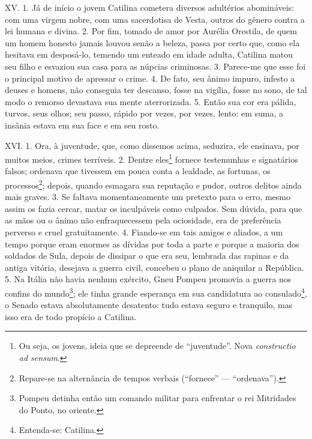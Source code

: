 XV. 1. Já de início o jovem Catilina cometera diversos adultérios abomináveis:
com uma virgem nobre, com uma sacerdotisa de Vesta, outros do gênero contra a
lei humana e divina. 2. Por fim, tomado de amor por Aurélia Orestila, de quem
um homem honesto jamais louvou senão a beleza, passa por certo que, como
ela hesitava em desposá-lo, temendo um enteado em idade adulta, Catilina matou
seu filho e esvaziou sua casa para as núpcias criminosas. 3. Parece-me que esse
foi o principal motivo de apressar o crime. 4. De fato, seu ânimo impuro,
infesto a deuses e homens, não conseguia ter descanso, fosse na vigília, fosse
no sono, de tal modo o remorso devastava sua mente aterrorizada. 5. Então sua
cor era pálida, turvos, seus olhos; seu passo, rápido por vezes, por vezes,
lento: em suma, a insânia estava em sua face e em seu rosto. 

XVI. 1. Ora, à juventude, que, como dissemos acima, seduzira, ele ensinava, por
muitos meios, crimes terríveis. 2. Dentre eles\footnote{Ou seja, os jovens, ideia que se depreende de ``juventude''. Nova \emph{constructio ad sensum}.} fornece testemunhas e
signatários falsos; ordenava que tivessem em pouca conta a lealdade, as
fortunas, os processos\footnote{Repare-se na alternância de tempos verbais
(``fornece'' --- ``ordenava'').}; depois, quando esmagara sua reputação e
pudor, outros delitos ainda mais graves. 3. Se faltava momentaneamente um
pretexto para o erro, mesmo assim os fazia cercar, matar os inculpáveis como
culpados.  Sem dúvida, para que as mãos ou o ânimo não enfraquecessem pela ociosidade,
era de preferência perverso e cruel gratuitamente. 4. Fiando-se em tais amigos
e aliados, a um tempo porque eram enormes as dívidas por toda a parte e porque
a maioria dos soldados de Sula, depois de dissipar o que era seu, lembrada das
rapinas e da antiga vitória, desejava a guerra civil, concebeu o plano de
aniquilar a República. 5. Na Itália não havia nenhum exército, Gneu Pompeu
promovia a guerra nos confins do mundo\footnote{Pompeu detinha então um comando
militar para enfrentar o rei Mitridades do Ponto, no oriente.};  ele tinha
grande esperança em sua candidatura ao consulado\footnote{Entenda-se:
Catilina.}, o Senado estava absolutamente desatento: tudo estava seguro e
tranquilo, mas isso era de todo propício a Catilina.

